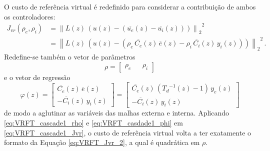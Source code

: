 \documentclass[repeatfields,oneside,overleaf]{tcc}
\newcommand{\mycdot}{ \, }
\newcommand{\myC}[2][]{ C_{#1} \left( #2 \right) }
\newcommand{\myoC}[2][]{ \overline{C_{#1}} \left( #2 \right) }
\newcommand{\myCzrho}[1]{ \myC[#1]{z, \rho_{#1}} }
\begin{document}
\newpage
O custo de referência virtual é redefinido para considerar a contribuição de ambos os controladores:
\begin{equation}\label{eq:VRFT_cascade1_Jvr}
\begin{aligned}
    J_{vr} \left( \rho_e, \rho_i \right)
    &= {\left\lVert L(z) \mycdot \left( u(z) - \left( \overline{u_e}(z) - \overline{u_i}(z) \right) \right) \right\rVert_2}^2\\
    &= {\left\lVert L(z) \mycdot \left( u(z) - \left( \rho_e \mycdot \myoC[e]{z} \mycdot \overline{e}(z) - \rho_i \mycdot \myoC[i]{z} \mycdot y_i(z) \right) \right) \right\rVert_2}^2
    \,.
\end{aligned}
\end{equation}
Redefine-se também o vetor de parâmetros
\begin{equation}\label{eq:VRFT_cascade1_rho}
    \rho = \begin{bmatrix} \rho_e && \rho_i \end{bmatrix}
\end{equation}
e o vetor de regressão
\begin{equation}\label{eq:VRFT_casdade1_phi}
    \varphi(z)
    =
    \begin{bmatrix}
        \myoC[e]{z} \mycdot \overline{e}(z)
        \\
        - \myoC[i]{z} \mycdot y_i(z)
    \end{bmatrix}
    =
    \begin{bmatrix}
        \myoC[e]{z} \mycdot \left( {T_d}^{-1}(z) - 1 \right) \mycdot y_e(z)
        \\
        - \myoC[i]{z} \mycdot y_i(z)
    \end{bmatrix}
\end{equation}
de modo a aglutinar as variáveis das malhas externa e interna.
Aplicando \eqref{eq:VRFT_cascade1_rho} e \eqref{eq:VRFT_casdade1_phi} em \eqref{eq:VRFT_cascade1_Jvr}, o custo de referência virtual volta a ter exatamente o formato da Equação \eqref{eq:VRFT_Jvr_2}, a qual é quadrática em $\rho$.
\end{document}
